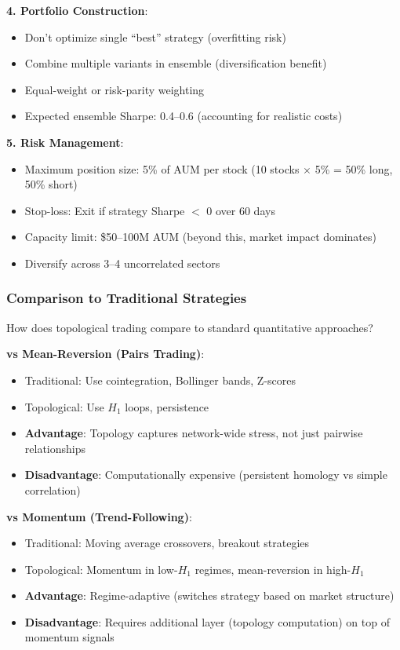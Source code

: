 \textbf{4. Portfolio Construction}:
\begin{itemize}
\item Don't optimize single ``best'' strategy (overfitting risk)
\item Combine multiple variants in ensemble (diversification benefit)
\item Equal-weight or risk-parity weighting
\item Expected ensemble Sharpe: 0.4--0.6 (accounting for realistic costs)
\end{itemize}

\textbf{5. Risk Management}:
\begin{itemize}
\item Maximum position size: 5\% of AUM per stock (10 stocks $\times$ 5\% = 50\% long, 50\% short)
\item Stop-loss: Exit if strategy Sharpe $<$ 0 over 60 days
\item Capacity limit: \$50--100M AUM (beyond this, market impact dominates)
\item Diversify across 3--4 uncorrelated sectors
\end{itemize}

\subsubsection{Comparison to Traditional Strategies}

How does topological trading compare to standard quantitative approaches?

\textbf{vs Mean-Reversion (Pairs Trading)}:
\begin{itemize}
\item Traditional: Use cointegration, Bollinger bands, Z-scores
\item Topological: Use $H_1$ loops, persistence
\item \textbf{Advantage}: Topology captures network-wide stress, not just pairwise relationships
\item \textbf{Disadvantage}: Computationally expensive (persistent homology vs simple correlation)
\end{itemize}

\textbf{vs Momentum (Trend-Following)}:
\begin{itemize}
\item Traditional: Moving average crossovers, breakout strategies
\item Topological: Momentum in low-$H_1$ regimes, mean-reversion in high-$H_1$
\item \textbf{Advantage}: Regime-adaptive (switches strategy based on market structure)
\item \textbf{Disadvantage}: Requires additional layer (topology computation) on top of momentum signals
\end{itemize}

